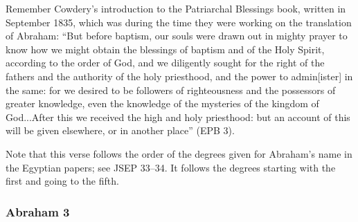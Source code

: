 		\begin{compactdesc}
		
		\item[2$\vert$]
		\begin{compactdesc}
		\item[I sought for the blessings of the fathers...] Remember Cowdery's introduction to the Patriarchal Blessings book, written in September 1835, which was during the time they were working on the translation of Abraham: ``But before baptism, our souls were drawn out in mighty prayer to know how we might obtain the blessings of baptism and of the Holy Spirit, according to the order of God, and we diligently sought for the right of the fathers and the authority of the holy priesthood, and the power to admin[ister] in the same: for we desired to be followers of righteousness and the possessors of greater knowledge, even the knowledge of the mysteries of the kingdom of God...After this we received the high and holy priesthood: but an account of this will be given elsewhere, or in another place'' (EPB 3).
		\item[Relation to Egyptian papers] Note that this verse follows the order of the degrees given for Abraham's name in the Egyptian papers; see JSEP 33--34. It follows the degrees starting with the first and going to the fifth.
		\end{compactdesc}
		
		\end{compactdesc}

	\subsubsection{Abraham 3} %
	
